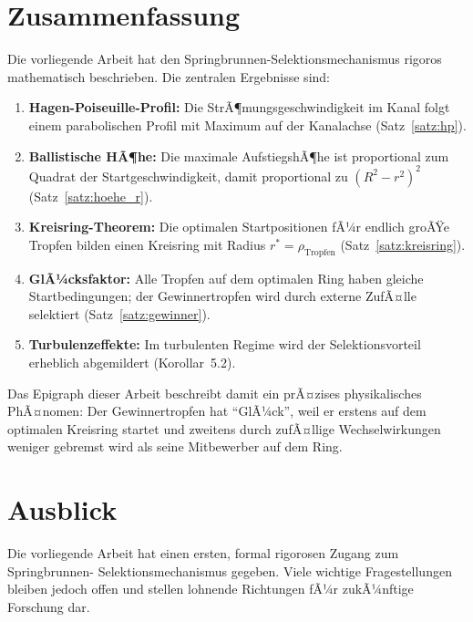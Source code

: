 ﻿\documentclass[a4paper,12pt]{article}
\theoremstyle{definition}
\begin{document}
\section{Zusammenfassung}

Die vorliegende Arbeit hat den Springbrunnen-Selektionsmechanismus rigoros mathematisch
beschrieben. Die zentralen Ergebnisse sind:

\begin{enumerate}
    \item \textbf{Hagen-Poiseuille-Profil:} Die StrÃ¶mungsgeschwindigkeit im Kanal folgt
          einem parabolischen Profil mit Maximum auf der Kanalachse (Satz~\ref{satz:hp}).
    \item \textbf{Ballistische HÃ¶he:} Die maximale AufstiegshÃ¶he ist proportional zum
          Quadrat der Startgeschwindigkeit, damit proportional zu $(R^2-r^2)^2$
          (Satz~\ref{satz:hoehe_r}).
    \item \textbf{Kreisring-Theorem:} Die optimalen Startpositionen fÃ¼r endlich groÃŸe
          Tropfen bilden einen Kreisring mit Radius $r^* = \rho_{\text{Tropfen}}$
          (Satz~\ref{satz:kreisring}).
    \item \textbf{GlÃ¼cksfaktor:} Alle Tropfen auf dem optimalen Ring haben gleiche
          Startbedingungen; der Gewinnertropfen wird durch externe ZufÃ¤lle selektiert
          (Satz~\ref{satz:gewinner}).
    \item \textbf{Turbulenzeffekte:} Im turbulenten Regime wird der Selektionsvorteil
          erheblich abgemildert (Korollar~5.2).
\end{enumerate}

Das Epigraph dieser Arbeit beschreibt damit ein prÃ¤zises physikalisches PhÃ¤nomen:
Der Gewinnertropfen hat ``GlÃ¼ck'', weil er erstens auf dem optimalen Kreisring startet
und zweitens durch zufÃ¤llige Wechselwirkungen weniger gebremst wird als seine
Mitbewerber auf dem Ring.

\section{Ausblick}

Die vorliegende Arbeit hat einen ersten, formal rigorosen Zugang zum Springbrunnen-
Selektionsmechanismus gegeben. Viele wichtige Fragestellungen bleiben jedoch offen
und stellen lohnende Richtungen fÃ¼r zukÃ¼nftige Forschung dar.
\end{document}
